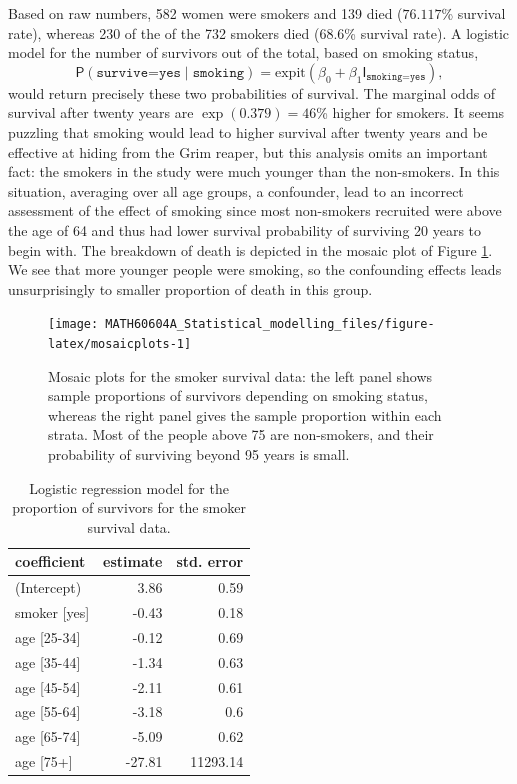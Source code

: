 \documentclass[
  11pt,
  letterpaper,
]{book}
\theoremstyle{definition}
\theoremstyle{definition}
\theoremstyle{definition}
\theoremstyle{definition}
\theoremstyle{remark}
\begin{document}
Based on raw numbers, 582 women were smokers and
139 died (\(76.117\)\% survival rate), whereas 230 of the of the 732 smokers died (\(68.6\)\% survival rate). A logistic model for the number of survivors out of the total, based on smoking status,
\[\mathsf{P}(\texttt{survive=yes} \mid \texttt{smoking}) = \mathrm{expit}(\beta_0+\beta_1 \mathsf{I}_{\texttt{smoking=yes}}), \]
would return precisely these two probabilities of survival. The marginal odds of survival after twenty years are \(\exp(0.379) = 46\)\%
higher for smokers. It seems puzzling that smoking would lead to higher survival after twenty years and be effective at hiding from the Grim reaper, but this analysis omits an important fact: the smokers in the study were much younger than the non-smokers. In this situation, averaging over all age groups, a confounder, lead to an incorrect assessment of the effect of smoking since most non-smokers recruited were above the age of 64 and thus had lower survival probability of surviving 20 years to begin with. The breakdown of death is depicted in the mosaic plot of Figure \ref{fig:mosaicplots}. We see that more younger people were smoking, so the confounding effects leads unsurprisingly to smaller proportion of death in this group.

\begin{figure}

{\centering \texttt{[image: MATH60604A\_Statistical\_modelling\_files/figure-latex/mosaicplots-1]} 

}

\caption{Mosaic plots for the smoker survival data: the left panel shows sample proportions of survivors depending on smoking status, whereas the right panel gives the sample proportion within each strata. Most of the people above 75 are non-smokers, and their probability of surviving beyond 95 years is small.}\label{fig:mosaicplots}
\end{figure}

\begin{table}

\caption{\label{tab:tablesmoker}Logistic regression model for the proportion of survivors for the smoker survival data.}
\centering
\begin{tabular}[t]{lrr}
\toprule
coefficient & estimate & std. error\\
\midrule
(Intercept) & 3.86 & 0.59\\
smoker [yes] & -0.43 & 0.18\\
age [25-34] & -0.12 & 0.69\\
age [35-44] & -1.34 & 0.63\\
age [45-54] & -2.11 & 0.61\\
\addlinespace
age [55-64] & -3.18 & 0.6\\
age [65-74] & -5.09 & 0.62\\
age [75+] & -27.81 & 11293.14\\
\bottomrule
\end{tabular}
\end{table}
\end{document}

